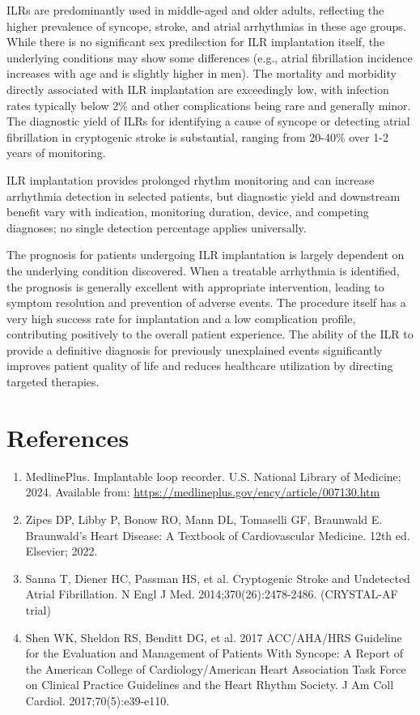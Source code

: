 ILRs are predominantly used in middle-aged and older adults, reflecting the higher prevalence of syncope, stroke, and atrial arrhythmias in these age groups. While there is no significant sex predilection for ILR implantation itself, the underlying conditions may show some differences (e.g., atrial fibrillation incidence increases with age and is slightly higher in men). The mortality and morbidity directly associated with ILR implantation are exceedingly low, with infection rates typically below 2\% and other complications being rare and generally minor. The diagnostic yield of ILRs for identifying a cause of syncope or detecting atrial fibrillation in cryptogenic stroke is substantial, ranging from 20-40\% over 1-2 years of monitoring.

ILR implantation provides prolonged rhythm monitoring and can increase arrhythmia detection in selected patients, but diagnostic yield and downstream benefit vary with indication, monitoring duration, device, and competing diagnoses; no single detection percentage applies universally.

The prognosis for patients undergoing ILR implantation is largely dependent on the underlying condition discovered. When a treatable arrhythmia is identified, the prognosis is generally excellent with appropriate intervention, leading to symptom resolution and prevention of adverse events. The procedure itself has a very high success rate for implantation and a low complication profile, contributing positively to the overall patient experience. The ability of the ILR to provide a definitive diagnosis for previously unexplained events significantly improves patient quality of life and reduces healthcare utilization by directing targeted therapies.

\section*{References}
\begin{enumerate}
  \item MedlinePlus. Implantable loop recorder. U.S. National Library of Medicine; 2024. Available from: \url{https://medlineplus.gov/ency/article/007130.htm}
  \item Zipes DP, Libby P, Bonow RO, Mann DL, Tomaselli GF, Braunwald E. Braunwald's Heart Disease: A Textbook of Cardiovascular Medicine. 12th ed. Elsevier; 2022.
  \item Sanna T, Diener HC, Passman HS, et al. Cryptogenic Stroke and Undetected Atrial Fibrillation. N Engl J Med. 2014;370(26):2478-2486. (CRYSTAL-AF trial)
  \item Shen WK, Sheldon RS, Benditt DG, et al. 2017 ACC/AHA/HRS Guideline for the Evaluation and Management of Patients With Syncope: A Report of the American College of Cardiology/American Heart Association Task Force on Clinical Practice Guidelines and the Heart Rhythm Society. J Am Coll Cardiol. 2017;70(5):e39-e110.
\end{enumerate}

\clearpage
